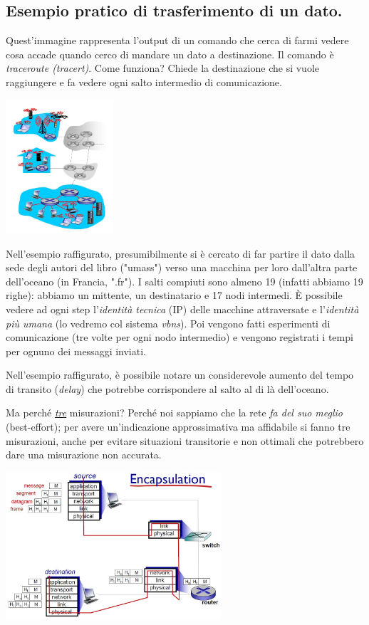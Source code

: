 \documentclass[10pt, a4paper, openany]{book}
\begin{document}
\subsection{Esempio pratico di trasferimento di un dato.}
\noindent Quest'immagine rappresenta l'output di un comando che cerca di farmi vedere cosa accade quando cerco di mandare un dato a destinazione. Il comando è \textit{traceroute (tracert)}. Come funziona? Chiede la destinazione che si vuole raggiungere e fa vedere ogni salto intermedio di comunicazione.
\begin{center}
    \includegraphics[width=40mm,scale=0.5]{cap1 - Introduzione alle reti - 2.jpg}
\end{center}
\noindent Nell'esempio raffigurato, presumibilmente si è cercato di far partire il dato dalla sede degli autori del libro ("umass") verso una macchina per loro dall'altra parte dell'oceano (in Francia, ".fr"). I salti compiuti sono almeno 19 (infatti abbiamo 19 righe): abbiamo un mittente, un destinatario e 17 nodi intermedi. È possibile vedere ad ogni step l'\textit{identità tecnica} (IP) delle macchine attraversate e l'\textit{identità più umana} (lo vedremo col sistema \textit{vbns}). Poi vengono fatti esperimenti di comunicazione (tre volte per ogni nodo intermedio) e vengono registrati i tempi per ognuno dei messaggi inviati.

\noindent Nell'esempio raffigurato, è possibile notare un considerevole aumento del tempo di transito (\textit{delay}) che potrebbe corrispondere al salto al di là dell'oceano.

\noindent Ma perché \underline{\textit{tre}} misurazioni? Perché noi sappiamo che la rete \textit{fa del suo meglio} (best-effort); per avere un'indicazione approssimativa ma affidabile si fanno tre misurazioni, anche per evitare situazioni transitorie e non ottimali che potrebbero dare una misurazione non accurata.
\begin{center}
    \includegraphics[width=80mm,scale=0.5]{cap1 - Introduzione alle reti - 32.jpg}
\end{center}
\end{document}
